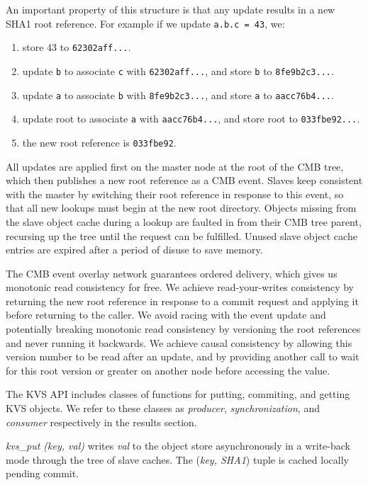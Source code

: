An important property of this structure is that any update results
in a new SHA1 root reference.  For example if we update {\tt a.b.c = 43}, we:
\begin{enumerate}
\item{store 43 to {\tt 62302aff...}.}
\item{update {\tt b} to associate {\tt c} with {\tt 62302aff...}, and store {\tt b} to {\tt 8fe9b2c3...}.}
\item{update {\tt a} to associate {\tt b} with {\tt 8fe9b2c3...}, and store {\tt a} to {\tt aacc76b4...}.}
\item{update root to associate {\tt a} with {\tt aacc76b4...}, and store root to {\tt 033fbe92...}.}
\item{the new root reference is {\tt 033fbe92}.}
\end{enumerate}

All updates are applied first on the master node at the root of the
CMB tree, which then publishes a new root reference as a CMB event.
Slaves keep consistent with the master by switching their root reference
in response to this event, so that all new lookups must begin at the
new root directory.  Objects missing from the slave object cache during
a lookup are faulted in from their CMB tree parent, recursing up the tree
until the request can be fulfilled.  Unused slave object cache entries are
expired after a period of disuse to save memory.

The CMB event overlay network guarantees ordered delivery, which gives
us monotonic read consistency for free.  We achieve read-your-writes
consistency by returning the new root reference in response to a commit
request and applying it before returning to the caller.  We avoid
racing with the event update and potentially breaking monotonic read
consistency by versioning the root references and never running it
backwards.  We achieve causal consistency by allowing this version number
to be read after an update, and by providing another call to wait for this
root version or greater on another node before accessing the value.

The KVS API includes classes of functions for putting, commiting, and
getting KVS objects.  We refer to these classes as
{\em producer}, {\em synchronization}, and {\em consumer} respectively
in the results section.

{\em kvs\_put (key, val)}
writes {\em val} to the object store asynchronously in a write-back
mode through the tree of slave caches.
The ({\em key, SHA1}) tuple is cached locally pending commit.

